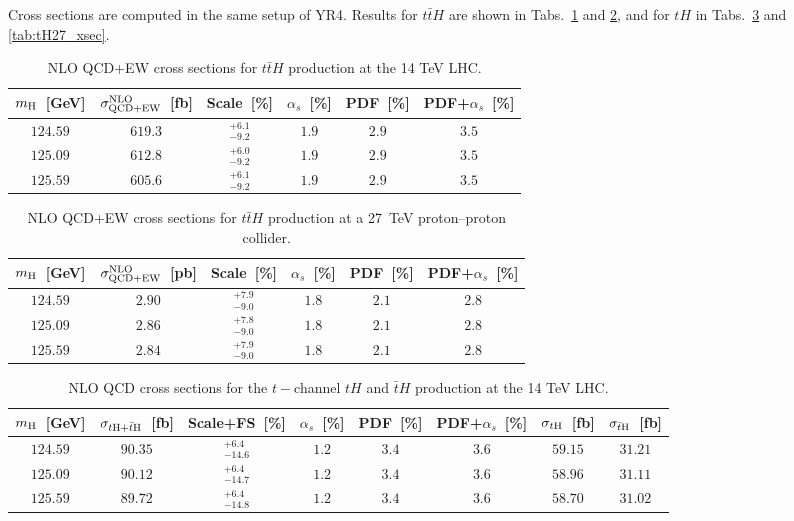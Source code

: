 \label{sec:he-lhc-ttH}
Cross sections are computed in the same setup of YR4. Results for $t\bar tH$ are shown in 
Tabs.~\ref{tab:ttH14_xsec} and \ref{tab:ttH27_xsec},
and for $tH$ in Tabs.~\ref{tab:tH14_xsec} and \ref{tab:tH27_xsec}.

\begin{table}
\centering
\begin{tabular}{cccccc}%
\toprule
$m_{\rm H}$~[GeV] & $\sigma^{\rm NLO}_{\rm QCD+EW}$~[fb] & Scale~[\%] &
$\alpha_s$~[\%] & PDF~[\%] & PDF+${\alpha_s}$~[\%]\\
\midrule
$124.59$ & $619.3$ & $^{+6.1}_{-9.2}$ & $1.9$ & $2.9$ & $3.5$ \\
$125.09$ & $612.8$ & $^{+6.0}_{-9.2}$ & $1.9$ & $2.9$ & $3.5$ \\
$125.59$ & $605.6$ & $^{+6.1}_{-9.2}$ & $1.9$ & $2.9$ & $3.5$ \\
\bottomrule
\end{tabular}%
\caption{NLO QCD+EW cross sections for $t\bar tH$ production at the 14 TeV LHC.}
\label{tab:ttH14_xsec}
\end{table}

\begin{table}
\centering
\begin{tabular}{cccccc}%
\toprule
$m_{\rm H}$~[GeV] & $\sigma^{\rm NLO}_{\rm QCD+EW}$~[pb] & Scale~[\%] &
$\alpha_s$~[\%] & PDF~[\%] & PDF+${\alpha_s}$~[\%]\\
\midrule
$124.59$ & $2.90$ & $^{+7.9}_{-9.0}$ & $1.8$ & $2.1$ & $2.8$ \\
$125.09$ & $2.86$ & $^{+7.8}_{-9.0}$ & $1.8$ & $2.1$ & $2.8$ \\
$125.59$ & $2.84$ & $^{+7.9}_{-9.0}$ & $1.8$ & $2.1$ & $2.8$ \\
\bottomrule
\end{tabular}%
\caption{NLO QCD+EW cross sections for $t\bar tH$ production at a 27~TeV proton--proton collider.}
\label{tab:ttH27_xsec}
\end{table}

\begin{table}
\centering
\begin{tabular}{cccccccc}%
\toprule
$m_{\rm H}$~[GeV] & $\sigma_{t{\rm H}+\bar t{\rm H}}$~[fb] & Scale+FS~[\%] &
$\alpha_s$~[\%] & PDF~[\%] & PDF+${\alpha_s}$~[\%] & $\sigma_{t{\rm H}}$~[fb] & 
$\sigma_{\bar t{\rm H}}$~[fb]\\
\midrule
$124.59$ & $90.35$ & $^{+6.4}_{-14.6}$ & $1.2$ & $3.4$ & $3.6$ & $59.15$ & $31.21$\\
$125.09$ & $90.12$ & $^{+6.4}_{-14.7}$ & $1.2$ & $3.4$ & $3.6$ & $58.96$ & $31.11$\\
$125.59$ & $89.72$ & $^{+6.4}_{-14.8}$ & $1.2$ & $3.4$ & $3.6$ & $58.70$ & $31.02$\\
\bottomrule
\end{tabular}%
\caption{NLO QCD cross sections for the $t-$channel $tH$ and $\bar t H$
production at the 14 TeV LHC.}
\label{tab:tH14_xsec}
\end{table}

